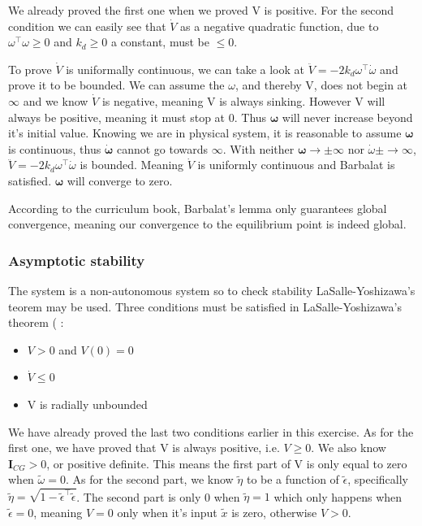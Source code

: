 We already proved the first one when we proved V is positive. For the second condition we can easily see that $\dot{V}$ as a negative quadratic function, due to $\omega^\top\omega \geq 0$ and $k_d \geq 0$ a constant, must be $\leq 0$.

To prove $\dot{V}$ is uniformally continuous, we can take a look at $\ddot{V} = -2k_d\omega^\top\dot{\omega}$ and prove it to be bounded. We can assume the $\omega$, and thereby V, does not begin at $\infty$ and we know $\dot{V}$ is negative, meaning V is always sinking. However V will always be positive, meaning it must stop at 0. Thus $\boldsymbol{\omega}$ will never increase beyond it's initial value. Knowing we are in physical system, it is reasonable to assume $\boldsymbol{\omega}$ is continuous, thus $\dot{\boldsymbol{\omega}}$ cannot go towards $\infty$. With neither $\boldsymbol{\omega} \rightarrow \pm\infty$ nor $\dot{\omega} \pm\rightarrow \infty$, $\ddot{V} = -2k_d\omega^\top\dot{\omega}$ is bounded. Meaning $\dot{V}$ is uniformly continuous and Barbalat is satisfied. $\boldsymbol{\omega}$ will converge to zero. 

According to the curriculum book\cite{Fossen2011}, Barbalat's lemma only guarantees global convergence, meaning our convergence to the equilibrium point is indeed global.

\subsubsection*{Asymptotic stability}

The system is a non-autonomous system so to check stability  LaSalle-Yoshizawa's teorem may be used. Three conditions must be satisfied in LaSalle-Yoshizawa's theorem ( :

\begin{itemize}
    \item $V > 0$ and  $V(0) = 0$
    \item $\dot{V} \leq 0$
    \item V is radially unbounded
\end{itemize}

We have already proved the last two conditions earlier in this exercise. As for the first one, we have proved that V is always positive, i.e. $V \geq 0$. We also know $\mathbf{I}_{CG} > 0$, or positive definite. This means the first part of V is only equal to zero when $\tilde{\omega} = 0$. As for the second part, we know $\tilde{\eta}$ to be a function of $\tilde{\epsilon}$, specifically $\tilde{\eta} = \sqrt{1 - \tilde{\epsilon}^\top\tilde{\epsilon}}$. The second part is only 0 when $\tilde{\eta} = 1$ which only happens when $\tilde{\epsilon} = 0$, meaning $V = 0$ only when it's input $\tilde{x}$ is zero, otherwise $V > 0$. 

